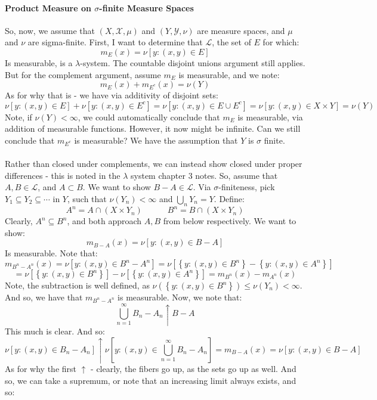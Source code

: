 \documentclass[12pt,a4paper]{article}
\newcommand{\1}[1]{\mathbbm{1}\left\{ #1 \right\}}
\newcommand{\lcal}{\mathcal{L}}
\newcommand{\xcal}{\mathcal{X}}
\newcommand{\ycal}{\mathcal{Y}}
\begin{document}
\paragraph{Product Measure on $\sigma$-finite Measure Spaces} So, now, we assume that $(X, \xcal, \mu)$ and $(Y, \ycal, \nu)$ are measure spaces, and $\mu$ and $\nu$ are sigma-finite. First, I want to determine that $\lcal$, the set of $E$ for which:
$$
	m_E(x) = \nu\left[y : (x,y) \in E\right]
$$
Is measurable, is a $\lambda$-system. The countable disjoint unions argument still applies. But for the complement argument, assume $m_E$ is measurable, and we note:
$$
	m_E(x) + m_{E^c}(x) = \nu(Y)
$$
As for why that is - we have via additivity of disjoint sets:
$$
	\nu\left[y : (x,y) \in E\right] +
	\nu\left[y : (x,y) \in E^c\right] =
	\nu\left[y : (x,y) \in E \cup E^c\right] =
	\nu\left[y : (x,y) \in X \times Y\right] = \nu(Y)
$$
Note, if $\nu(Y) < \infty$, we could automatically conclude that $m_E$ is measurable, via addition of measurable functions. However, it now might be infinite. Can we still conclude that $m_{E^c}$ is measurable? We have the assumption that $Y$ is $\sigma$ finite.
\\\\
Rather than closed under complements, we can instead show closed under proper differences - this is noted in the $\lambda$ system chapter 3 notes. So, assume that $A, B \in \lcal$, and $A \subset B$. We want to show $B - A \in \lcal$. Via $\sigma$-finiteness, pick $Y_1 \subseteq Y_2 \subseteq \cdots$ in $Y$, such that $\nu(Y_n) < \infty$ and $\bigcup_n Y_n = Y$. Define:
$$
	A^n = A \cap (X \times Y_n) \quad\quad\quad
	B^n = B \cap (X \times Y_n)
$$
Clearly, $A^n \subseteq B^n$, and both approach $A,B$ from below respectively. We want to show:
$$
	m_{B - A}(x) = \nu\left[y : (x,y) \in B - A\right]
$$
Is measurable. Note that:
$$
	m_{B^n - A^n}(x) =
	\nu\left[y : (x,y) \in B^n - A^n\right] =
	\nu\left[\left\{y : (x,y) \in B^n\right\} - \left\{y : (x,y) \in A^n\right\}\right]
$$
$$
	=
	\nu\left[\left\{y : (x,y) \in B^n\right\}\right] - \nu\left[\left\{y : (x,y) \in A^n\right\}\right]
	= m_{B^n}(x) - m_{A^n}(x)
$$
Note, the subtraction is well defined, as $\nu(\left\{y : (x,y) \in B^n\right\}) \leq \nu(Y_n) < \infty$. And so, we have that $m_{B^n - A^n}$ is measurable. Now, we note that:
$$
	\bigcup_{n=1}^\infty B_n - A_n \uparrow B - A
$$
This much is clear. And so:
$$
	\nu\left[y : (x,y) \in B_n - A_n\right] \uparrow
	\nu\left[y : (x,y) \in \bigcup_{n=1}^\infty B_n - A_n\right] =
	m_{B - A}(x) = \nu\left[y : (x,y) \in B - A\right]
$$
As for why the first $\uparrow$ - clearly, the fibers go up, as the sets go up as well. And so, we can take a supremum, or note that an increasing limit always exists, and so:
\end{document}
